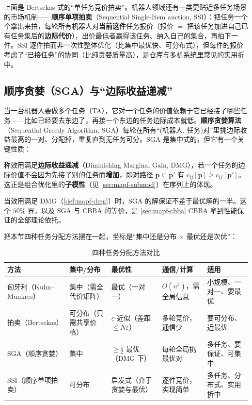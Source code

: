 上面是 Bertsekas 式的“单任务竞价拍卖”。机器人领域还有一类更贴近多任务场景的市场机制——\textbf{顺序单项拍卖}（Sequential Single-Item auction, SSI）\cite{koenig2006ssi}：把任务一个个拿出来拍，每轮所有机器人对\textbf{当前这件}任务报价（报价 $=$ 把该任务加进自己已有任务集后的\textbf{边际代价}），出价最低者赢得该任务、纳入自己的集合，再拍下一件。SSI 逐件拍而非一次性整体优化（比集中最优快、可分布式），但每件的报价考虑了“已接任务”的协同（比纯贪婪质量高），是仓库与多机系统里常见的实用折中。

\subsection{顺序贪婪（SGA）与“边际收益递减”}
\label{sec:mapf-sga}

当一台机器人要做多个任务（TA），它对一个任务的价值依赖于它已经接了哪些任务——比如已经要去东边了，再接一个东边的任务边际成本就低。\textbf{顺序贪婪算法}（Sequential Greedy Algorithm, SGA）每轮在所有“(机器人, 任务)对”里挑边际收益最高的一对、分配掉，重复直到无任务可分。SGA 是集中式的，但它有一个关键性质：

\begin{definition}\label{def:mapf-dmg}
称效用满足\textbf{边际收益递减}（Diminishing Marginal Gain, DMG），若一个任务的边际价值不会因为先接了别的任务而\textbf{增加}，即对路径 $\mathbf{p}\subseteq\mathbf{p}'$ 有 $c_{ij}[\mathbf{p}]\ge c_{ij}[\mathbf{p}']$。这正是组合优化里的\textbf{子模性}（见 \cref{sec:mapf-submod}）在序列上的体现。
\end{definition}

\begin{theorem}[SGA 的 $50\%$ 界]\label{thm:mapf-sga}
当效用满足 DMG（\cref{def:mapf-dmg}）时，SGA 的解保证不差于最优解的一半。这个 $50\%$ 界，以及 SGA 与 CBBA 的等价，是 \cref{sec:mapf-cbba} CBBA 拿到性能保证的全部理论依托。
\end{theorem}

把本节四种任务分配方法摆在一起，坐标是“集中还是分布 $\times$ 最优还是次优”：

\begin{table}[H]\centering\small
\caption{四种任务分配方法对比}
\label{tab:mapf-assign-compare}
\begin{tabular}{lllll}
\toprule
方法 & 集中/分布 & 最优性 & 通信/计算 & 适用 \\
\midrule
匈牙利（Kuhn--Munkres） & 集中（需全代价矩阵） & 最优（一对一） & $O(n^3)$，需全局信息 & 小规模、一对一、要最优 \\
拍卖（Bertsekas） & 可分布（只需共享价格） & $\varepsilon$-近似（差距 $\le N\varepsilon$） & 多轮竞价，通信少 & 要可分布、近最优 \\
SGA（顺序贪婪） & 集中 & $\ge\tfrac12$ 最优（DMG 下） & 每轮全局挑最优对 & 多任务、要保证、可集中 \\
SSI（顺序单项拍卖） & 可分布 & 启发式（介于贪婪与最优） & 逐件竞价，实现简单 & 多任务、分布式、实用折中 \\
\bottomrule
\end{tabular}
\end{table}


